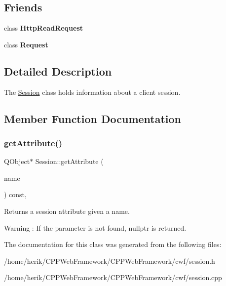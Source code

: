 \subsection*{Friends}
\begin{DoxyCompactItemize}
\item 
\mbox{\label{class_session_a4d54f5003e07e218070a449c22a52c7c}} 
class {\bfseries Http\+Read\+Request}
\item 
\mbox{\label{class_session_a5719d6ff12298e668b17796c87450d5b}} 
class {\bfseries Request}
\end{DoxyCompactItemize}


\subsection{Detailed Description}
The \hyperlink{class_session}{Session} class holds information about a client session. 

\subsection{Member Function Documentation}
\mbox{\label{class_session_a8c4e4bd7aa6d6fb16ab3dcdb5e892783}} 
\subsubsection{\texorpdfstring{get\+Attribute()}{getAttribute()}}
{\footnotesize\ttfamily Q\+Object$\ast$ Session\+::get\+Attribute (\begin{DoxyParamCaption}\item[{const Q\+String \&}]{name }\end{DoxyParamCaption}) const\hspace{0.3cm}{\ttfamily [inline]}, {\ttfamily [noexcept]}}



Returns a session attribute given a name. 

\begin{DoxyWarning}{Warning}
\+: If the parameter is not found, nullptr is returned. 
\end{DoxyWarning}


The documentation for this class was generated from the following files\+:\begin{DoxyCompactItemize}
\item 
/home/herik/\+C\+P\+P\+Web\+Framework/\+C\+P\+P\+Web\+Framework/cwf/session.\+h\item 
/home/herik/\+C\+P\+P\+Web\+Framework/\+C\+P\+P\+Web\+Framework/cwf/session.\+cpp\end{DoxyCompactItemize}
